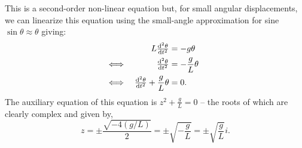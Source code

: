 \documentclass[../MathsNotesBase.tex]{subfiles}
\begin{document}
{\begin{exe}
{				This is a second-order non-linear equation but, for small angular displacements, we can linearize this equation using the small-angle approximation for sine ${ \sin\theta \approx \theta }$ giving:
				\begin{align*}
					&&  L \od[2]{\theta}{t} &= - g \theta \\
					&\iff & \od[2]{\theta}{t} &= - \frac{g}{L} \theta &\sidecomment{} \\
					&\iff & \od[2]{\theta}{t} + \frac{g}{L} \theta &= 0.
				\end{align*}
				The auxiliary equation of this equation is ${ z^2 + \frac{g}{L} = 0 }$ -- the roots of which are clearly complex and given by,
				\[ z = \pm \frac{\sqrt{-4(g/L)}}{2} = \pm \sqrt{-\frac{g}{L}} = \pm \sqrt{\frac{g}{L}} i. \]
				
				
			}\label{ex:pendulum-second-order-linear}
		\end{exe}
	}




	\pagebreak



\end{document}
